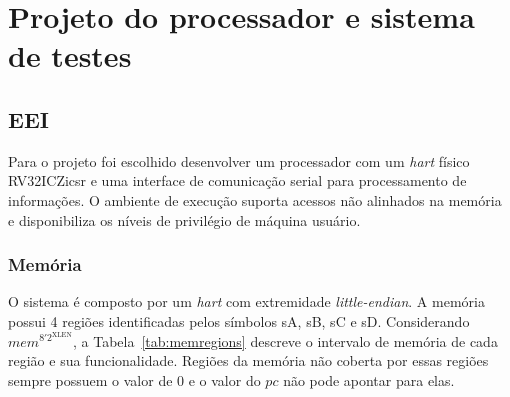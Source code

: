 
\chapter{Projeto do processador e sistema de testes}
\label{cap:3}

\section{EEI}
\label{sec:eei}

Para o projeto foi escolhido desenvolver um processador com um \emph{hart} físico RV32ICZicsr e 
uma interface de comunicação serial para processamento de informações. O ambiente de execução
suporta acessos não alinhados na memória e disponibiliza os níveis de privilégio de máquina
usuário.

\subsection{Memória}
\label{ssec:msr}

O sistema é composto por um \emph{hart} com extremidade \emph{little-endian}. A memória possui 4
regiões identificadas pelos símbolos sA, sB, sC e sD. Considerando $mem^{8'2^\text{XLEN}}$, a Tabela~\ref{tab:memregions} 
descreve o intervalo
de memória de cada região e sua funcionalidade. Regiões da memória não coberta por essas regiões
sempre possuem o valor de 0 e o valor do $pc$ não pode apontar para elas.


